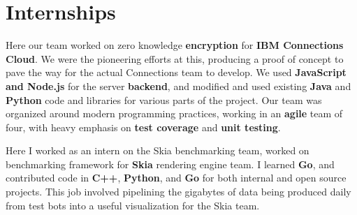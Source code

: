 \documentclass{my_resume}
\begin{document}
\section{Internships}
\begin{flushleft}
Here our team worked on zero knowledge \textbf{encryption} for 
\textbf{IBM Connections Cloud}. We were the pioneering efforts at this, producing
a proof of concept to pave the way for the actual Connections team to develop.
We used \textbf{JavaScript and Node.js} for the server \textbf{backend}, and
modified and used existing \textbf{Java} and \textbf{Python} code and libraries
for various parts of the project. Our team was organized around modern programming
practices, working in an \textbf{agile} team of four, with heavy emphasis on
\textbf{test coverage} and \textbf{unit testing}.
\end{flushleft}
\begin{flushleft}
Here I worked as an intern on the Skia benchmarking team, worked on benchmarking
framework for \textbf{Skia} rendering engine team. I learned \textbf{Go}, and
contributed code in \textbf{C++}, \textbf{Python}, and \textbf{Go} for both
internal and open source projects. This job involved pipelining the gigabytes
of data being produced daily from test bots into a useful visualization for the
Skia team.
\end{flushleft}
\end{document}

